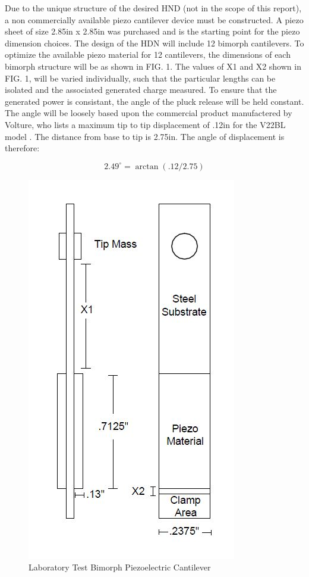 \documentclass[aps,prl,twocolumn,groupedaddress]{revtex4}
\begin{document}
Due to the unique structure of the desired HND (not in the scope of this report), a non commercially available piezo cantilever device must be constructed. A piezo sheet of size 2.85in x 2.85in was purchased and is the starting point for the piezo dimension choices. The design of the HDN will include 12 bimorph cantilevers. To optimize the available piezo material for 12 cantilevers,  the dimensions of each bimorph structure will be as shown in FIG. 1. The values of X1 and X2 shown in FIG. 1, will be varied individually, such that the particular lengths can be isolated and the associated generated charge measured. To ensure that the generated power is consistant, the angle of the pluck release will be held constant. The angle will be loosely based upon the commercial product manufactered by Volture, who lists a maximum tip to tip displacement of .12in for the V22BL model \footnotemark{}. The distance from base to tip is 2.75in. The angle of displacement is therefore: 

\begin{equation}
 2.49 ^\circ = \arctan (.12/2.75)
\end{equation}

\begin{figure}[ht!]
  \centering
  \includegraphics[scale=0.6]{Bimorph_Cantilever.jpg}
  \caption{Laboratory Test Bimorph Piezoelectric Cantilever}
\end{figure}
\end{document}
